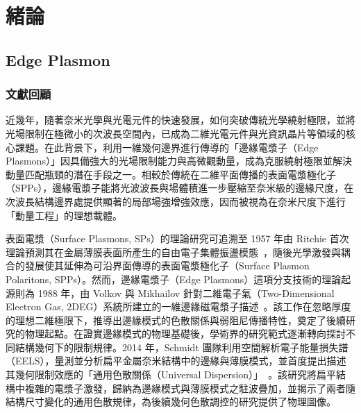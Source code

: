
\chapter{緒論}


\section{Edge Plasmon}

\subsection{文獻回顧}

近幾年，隨著奈米光學與光電元件的快速發展，如何突破傳統光學繞射極限，並將光場限制在極微小的次波長空間內，已成為二維光電元件與光資訊晶片等領域的核心課題。在此背景下，利用一維幾何邊界進行傳導的「邊緣電漿子（Edge Plasmons）」因具備強大的光場限制能力與高微觀動量，成為克服繞射極限並解決動量匹配瓶頸的潛在手段之一。相較於傳統在二維平面傳播的表面電漿極化子（SPPs），邊緣電漿子能將光波波長與場體積進一步壓縮至奈米級的邊緣尺度，在次波長結構邊界處提供顯著的局部場強增強效應，因而被視為在奈米尺度下進行「動量工程」的理想載體。

表面電漿（Surface Plasmons, SPs）的理論研究可追溯至 1957 年由 Ritchie 首次理論預測其在金屬薄膜表面所產生的自由電子集體振盪模態~\cite{ritchie1957plasma}，隨後光學激發與耦合的發展使其延伸為可沿界面傳導的表面電漿極化子（Surface Plasmon Polaritons, SPPs）。然而，邊緣電漿子（Edge Plasmons）這項分支技術的理論起源則為 1988 年，由 Volkov 與 Mikhailov 針對二維電子氣（Two-Dimensional Electron Gas, 2DEG）系統所建立的一維邊緣磁電漿子描述~\cite{volkov1988edge}。該工作在忽略厚度的理想二維極限下，推導出邊緣模式的色散關係與弱阻尼傳播特性，奠定了後續研究的物理起點。在證實邊緣模式的物理基礎後，學術界的研究範式逐漸轉向探討不同結構幾何下的限制規律。2014 年，Schmidt 團隊利用空間解析電子能量損失譜（EELS），量測並分析扁平金屬奈米結構中的邊緣與薄膜模式，並首度提出描述其幾何限制效應的「通用色散關係（Universal Dispersion）」~\cite{schmidt2014}。該研究將扁平結構中複雜的電漿子激發，歸納為邊緣模式與薄膜模式之駐波疊加，並揭示了兩者隨結構尺寸變化的通用色散規律，為後續幾何色散調控的研究提供了物理圖像。

